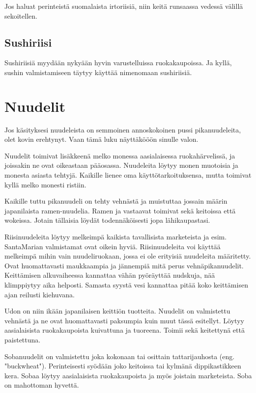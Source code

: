 \documentclass[../keittiokirja.tex]{subfiles}
\begin{document}
Jos haluat perinteistä suomalaista irtoriisiä, niin keitä runsaassa vedessä välillä sekoitellen.

\subsection{Sushiriisi}

Sushiriisiä myydään nykyään hyvin varustelluissa ruokakaupoissa. Ja kyllä, sushin valmistamiseen 
täytyy käyttää nimenomaan sushiriisiä. 


\section{Nuudelit}

Jos käsityksesi nuudeleista on semmoinen annoskokoinen pussi pikanuudeleita, olet kovin erehtynyt. 
Vaan tämä luku näyttäkööön sinulle valon. 

Nuudelit toimivat lisäkkeenä melko monessa aasialaisessa ruokahärvelissä, ja joissakin ne ovat 
oikeastaan pääosassa. Nuudeleita löytyy monen muotoisia ja monesta asiasta tehtyjä. Kaikille lienee
oma käyttötarkoituksensa, mutta toimivat kyllä melko monesti ristiin.

Kaikille tuttu pikanuudeli on tehty vehnästä ja muistuttaa jossain määrin japanilaista ramen-nuudelia. 
Ramen ja vastaavat toimivat sekä keitoissa että wokeissa. Jotain tällaisia löydät todennäköisesti 
jopa lähikaupastasi.

Riisinuudeleita löytyy melkeimpä kaikista tavallisista marketeista ja esim. SantaMarian valmistamat 
ovat oikein hyviä. Riisinuudeleita voi käyttää melkeimpä mihin vain nuudeliruokaan, jossa ei ole erityisiä 
nuudeleita määritetty. Ovat huomattavasti maukkaampia ja jännempiä mitä perus vehnäpikanuudelit. 
Keittämisen alkuvaiheessa kannattaa vähän pyöräyttää nudskuja, nää klimppiytyy aika helposti. Samasta 
syystä vesi kannattaa pitää koko keittämisen ajan reilusti kiehuvana.

Udon on niin ikään japanilaisen keittiön tuotteita. Nuudelit on valmistettu vehnästä ja ne ovat 
huomattavasti paksumpia kuin muut tässä esitellyt. Löytyy aasialaisista ruokakaupoista kuivattuna 
ja tuoreena. Toimii sekä keitettynä että paistettuna.

Sobanuudelit on valmistettu joka kokonaan tai osittain tattarijauhosta (eng. "buckwheat"). Perinteisesti
syödään joko keitoissa tai kylmänä dippikastikkeen kera. Sobaa löytyy aasialaisista ruokakaupoista 
ja myös joistain marketeista. Soba on mahottoman hyvettä.
\end{document}
